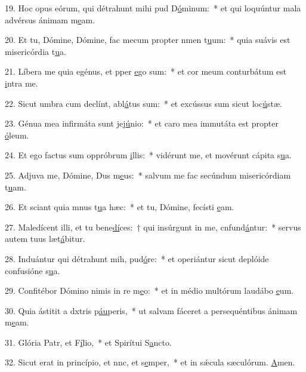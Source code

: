 19. Hoc opus eórum, qui détrahunt mihi pud D\uline{ó}minum:~* et qui loquúntur mala advérsus ánimam m\uline{e}am.\par 
20. Et tu, Dómine, Dómine, fac mecum propter nmen t\uline{u}um:~* quia suávis est misericórdia t\uline{u}a.\par 
21. Líbera me quia egénus, et pper \uline{e}go sum:~* et cor meum conturbátum est \uline{i}ntra me.\par 
22. Sicut umbra cum declínt, abl\uline{á}tus sum:~* et excússus sum sicut loc\uline{ú}stæ.\par 
23. Génua mea infirmáta sunt  jej\uline{ú}nio:~* et caro mea immutáta est propter \uline{ó}leum.\par 
24. Et ego factus sum oppróbrum \uline{i}llis:~* vidérunt me, et movérunt cápita s\uline{u}a.\par 
25. Adjuva me, Dómine, Dus m\uline{e}us:~* salvum me fac secúndum misericórdiam t\uline{u}am.\par 
26. Et sciant quia mnus t\uline{u}a hæc:~* et tu, Dómine, fecísti \uline{e}am.\par 
27. Maledícent illi, et tu bene\uline{dí}ces:~† qui insúrgunt in me, cnfund\uline{á}ntur:~* servus autem tuus læt\uline{á}bitur.\par 
28. Induántur qui détrahunt mih, pud\uline{ó}re:~* et operiántur sicut deplóide confusióne s\uline{u}a.\par 
29. Confitébor Dómino nimis in re m\uline{e}o:~* et in médio multórum laudábo \uline{e}um.\par 
30. Quia ástitit a dxtris p\uline{áu}peris,~* ut salvam fáceret a persequéntibus ánimam m\uline{e}am.\par 
31. Glória Patr, et F\uline{í}lio,~* et Spirítui S\uline{a}ncto.\par 
32. Sicut erat in princípio, et nnc, et s\uline{e}mper,~* et in sǽcula sæculórum. \uline{A}men.\par 
